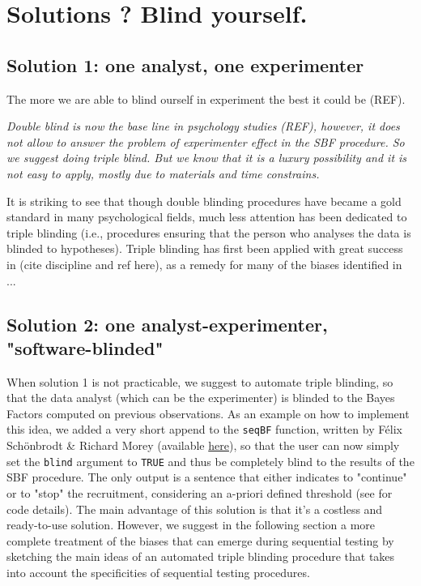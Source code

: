 \documentclass[a4paper,man,natbib,floatsintext,donotrepeattitle]{apa6}
\begin{document}
\section{Solutions ? Blind yourself.}

\subsection{Solution 1: one analyst, one experimenter}
The more we are able to blind ourself in experiment the best it could be (REF). 

\textit{Double blind is now the base line in psychology studies (REF), however, it does not allow to answer the problem of experimenter effect in the SBF procedure. So we suggest doing triple blind. But we know that it is a luxury possibility and it is not easy to apply, mostly due to materials and time constrains.}


It is striking to see that though double blinding procedures have became a gold standard in many psychological fields, much less attention has been dedicated to triple blinding (i.e., procedures ensuring that the person who analyses the data is blinded to hypotheses). Triple blinding has first been applied with great success in (cite discipline and ref here), as a remedy for many of the biases identified in \cite{wicherts_degrees_2016}...

\subsection{Solution 2: one analyst-experimenter, "software-blinded"}
When solution 1 is not practicable, we suggest to automate triple blinding, so that the data analyst (which can be the experimenter) is blinded to the Bayes Factors computed on previous observations. As an example on how to implement this idea, we added a very short append to the \texttt{seqBF} function, written by Félix Schönbrodt \& Richard Morey (available \href{https://raw.githubusercontent.com/richarddmorey/BayesFactorExtras/master/BayesFactorExtras/R/seqBF.R}{here}), so that the user can now simply set the \texttt{blind} argument to \texttt{TRUE} and thus be completely blind to the results of the SBF procedure. The only output is a sentence that either indicates to "continue" or to "stop" the recruitment, considering an a-priori defined threshold (see  for code details). The main advantage of this solution is that it's a costless and ready-to-use solution. However, we suggest in the following section a more complete treatment of the biases that can emerge during sequential testing by sketching the main ideas of an automated triple blinding procedure that takes into account the specificities of sequential testing procedures.
\end{document}
